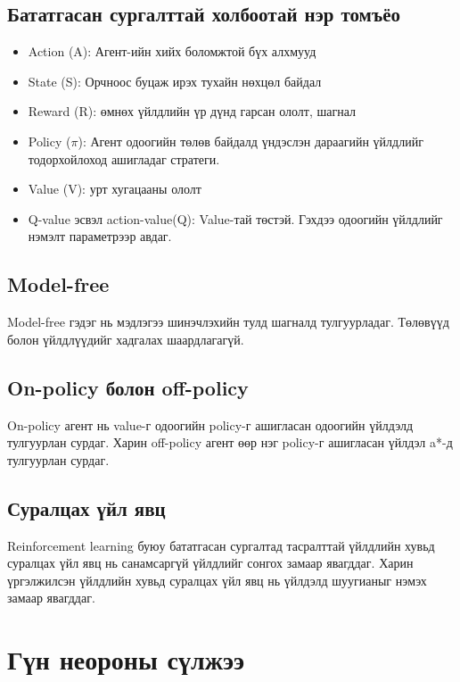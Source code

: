 \documentclass[12pt,A4]{report}
\begin{document}
\subsection{Бататгасан сургалттай холбоотай нэр томъёо}

\begin{itemize}
	\item Action (A): Агент-ийн хийх боломжтой бүх алхмууд
	\item State (S): Орчноос буцаж ирэх тухайн нөхцөл байдал
	\item Reward (R): өмнөх үйлдлийн үр дүнд гарсан ололт, шагнал
	\item Policy (\(\pi\)): Агент одоогийн төлөв байдалд үндэслэн дараагийн үйлдлийг тодорхойлоход ашигладаг стратеги. 
	\item Value (V): урт хугацааны ололт
	\item Q-value эсвэл action-value(Q): Value-тай төстэй. Гэхдээ одоогийн үйлдлийг нэмэлт параметрээр авдаг.
\end{itemize}

\subsection{Model-free}

Model-free гэдэг нь мэдлэгээ шинэчлэхийн тулд шагналд тулгуурладаг. Төлөвүүд болон үйлдлүүдийг хадгалах шаардлагагүй. 

\subsection{On-policy болон off-policy}

On-policy агент нь value-г одоогийн policy-г ашигласан одоогийн үйлдэлд тулгуурлан сурдаг. Харин off-policy агент өөр нэг policy-г ашигласан үйлдэл a*-д тулгуурлан сурдаг.

\subsection{Суралцах үйл явц}

Reinforcement learning буюу бататгасан сургалтад тасралттай үйлдлийн хувьд суралцах үйл явц нь санамсаргүй үйлдлийг сонгох замаар явагддаг. Харин үргэлжилсэн үйлдлийн хувьд суралцах үйл явц нь үйлдэлд шуугианыг нэмэх замаар явагддаг.

\section{Гүн неороны сүлжээ}
\end{document}
